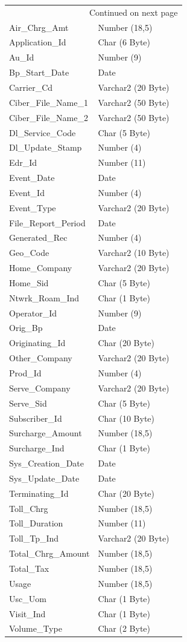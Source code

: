 \documentclass[12pt,twoside]{article}
\begin{document}
\begin{longtable}{l|l|l}
\hline
\endhead
\hline\multicolumn{3}{r}{Continued on next page} \\
\endfoot
\endlastfoot
\hline
Air\_Chrg\_Amt & Number (18,5) & \\
Application\_Id & Char (6 Byte) & \\
Au\_Id & Number (9) & \\
Bp\_Start\_Date & Date & \\
Carrier\_Cd & Varchar2 (20 Byte) & \\
Ciber\_File\_Name\_1 & Varchar2 (50 Byte) & \\
Ciber\_File\_Name\_2 & Varchar2 (50 Byte) & \\
Dl\_Service\_Code & Char (5 Byte) & \\
Dl\_Update\_Stamp & Number (4) & \\
Edr\_Id & Number (11) & \\
Event\_Date & Date & \\
Event\_Id & Number (4) & \\
Event\_Type & Varchar2 (20 Byte) & \\
File\_Report\_Period & Date & \\
Generated\_Rec & Number (4) & \\
Geo\_Code & Varchar2 (10 Byte) & \\
Home\_Company & Varchar2 (20 Byte) & \\
Home\_Sid & Char (5 Byte) & \\
Ntwrk\_Roam\_Ind & Char (1 Byte) & \\
Operator\_Id & Number (9) & \\
Orig\_Bp & Date & \\
Originating\_Id & Char (20 Byte) & \\
Other\_Company & Varchar2 (20 Byte) & \\
Prod\_Id & Number (4) & \\
Serve\_Company & Varchar2 (20 Byte) & \\
Serve\_Sid & Char (5 Byte) & \\
Subscriber\_Id & Char (10 Byte) & \\
Surcharge\_Amount & Number (18,5) & \\
Surcharge\_Ind & Char (1 Byte) & \\
Sys\_Creation\_Date & Date & \\
Sys\_Update\_Date & Date & \\
Terminating\_Id & Char (20 Byte) & \\
Toll\_Chrg & Number (18,5) & \\
Toll\_Duration & Number (11) & \\
Toll\_Tp\_Ind & Varchar2 (20 Byte) & \\
Total\_Chrg\_Amount & Number (18,5) & \\
Total\_Tax & Number (18,5) & \\
Usage & Number (18,5) & \\
Usc\_Uom & Char (1 Byte) & \\
Visit\_Ind & Char (1 Byte) & \\
Volume\_Type & Char (2 Byte) & \\
\hline
\end{longtable}
\normalsize
\newpage
\end{document}
